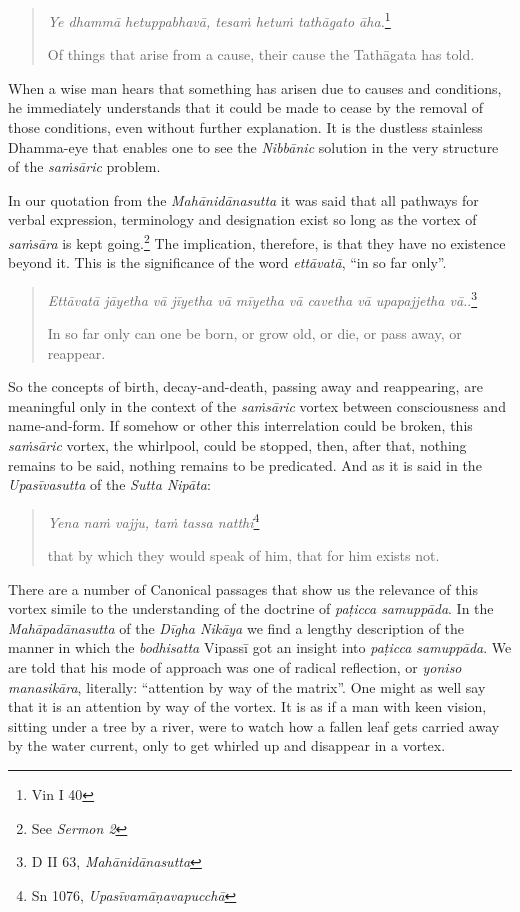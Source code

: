 \begin{quote}
\emph{Ye dhammā hetuppabhavā, tesaṁ hetuṁ tathāgato āha.}\footnote{Vin I 40}

Of things that arise from a cause, their cause the Tathāgata has told.
\end{quote}

When a wise man hears that something has arisen due to causes and conditions, he immediately understands that it could be made to cease by the removal of those conditions, even without further explanation. It is the dustless stainless Dhamma-eye that enables one to see the \emph{Nibbānic} solution in the very structure of the \emph{saṁsāric} problem.

In our quotation from the \emph{Mahānidānasutta} it was said that all pathways for verbal expression, terminology and designation exist so long as the vortex of \emph{saṁsāra} is kept going.\footnote{See \emph{Sermon 2}} The implication, therefore, is that they have no existence beyond it. This is the significance of the word \emph{ettāvatā}, ``in so far only''.

\begin{quote}
\emph{Ettāvatā jāyetha vā jīyetha vā mīyetha vā cavetha vā upapajjetha vā.}.\footnote{D II 63, \emph{Mahānidānasutta}}

In so far only can one be born, or grow old, or die, or pass away, or reappear.
\end{quote}

So the concepts of birth, decay-and-death, passing away and reappearing, are meaningful only in the context of the \emph{saṁsāric} vortex between consciousness and name-and-form. If somehow or other this interrelation could be broken, this \emph{saṁsāric} vortex, the whirlpool, could be stopped, then, after that, nothing remains to be said, nothing remains to be predicated. And as it is said in the \emph{Upasīvasutta} of the \emph{Sutta Nipāta}:

\begin{quote}
\emph{Yena naṁ vajju, taṁ tassa natthi}\footnote{Sn 1076, \emph{Upasīvamāṇavapucchā}}

that by which they would speak of him, that for him exists not.
\end{quote}

There are a number of Canonical passages that show us the relevance of this vortex simile to the understanding of the doctrine of \emph{paṭicca samuppāda}. In the \emph{Mahāpadānasutta} of the \emph{Dīgha Nikāya} we find a lengthy description of the manner in which the \emph{bodhisatta} Vipassī got an insight into \emph{paṭicca samuppāda}. We are told that his mode of approach was one of radical reflection, or \emph{yoniso manasikāra}, literally: ``attention by way of the matrix''. One might as well say that it is an attention by way of the vortex. It is as if a man with keen vision, sitting under a tree by a river, were to watch how a fallen leaf gets carried away by the water current, only to get whirled up and disappear in a vortex.

